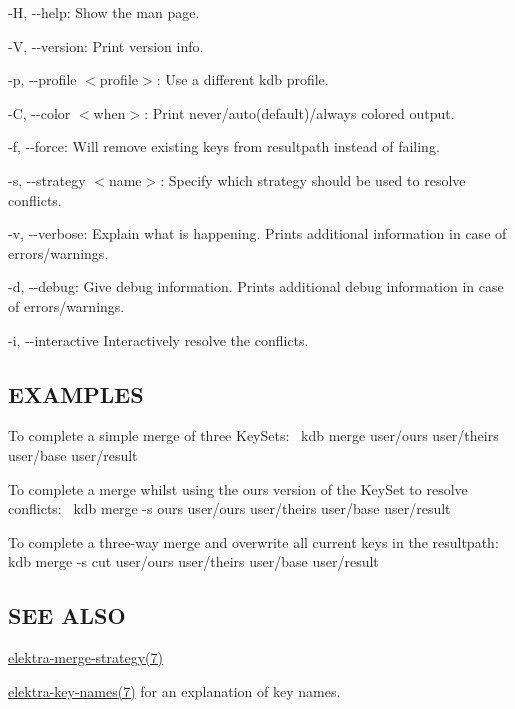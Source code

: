 \begin{DoxyItemize}
\item {\ttfamily -\/H}, {\ttfamily -\/-\/help}\+: Show the man page.
\item {\ttfamily -\/V}, {\ttfamily -\/-\/version}\+: Print version info.
\item {\ttfamily -\/p}, {\ttfamily -\/-\/profile $<$profile$>$}\+: Use a different kdb profile.
\item {\ttfamily -\/C}, {\ttfamily -\/-\/color $<$when$>$}\+: Print never/auto(default)/always colored output.
\item {\ttfamily -\/f}, {\ttfamily -\/-\/force}\+: Will remove existing keys from {\ttfamily resultpath} instead of failing.
\item {\ttfamily -\/s}, {\ttfamily -\/-\/strategy $<$name$>$}\+: Specify which strategy should be used to resolve conflicts.
\item {\ttfamily -\/v}, {\ttfamily -\/-\/verbose}\+: Explain what is happening. Prints additional information in case of errors/warnings.
\item {\ttfamily -\/d}, {\ttfamily -\/-\/debug}\+: Give debug information. Prints additional debug information in case of errors/warnings.
\item {\ttfamily -\/i}, {\ttfamily -\/-\/interactive} Interactively resolve the conflicts.
\end{DoxyItemize}

\subsection*{E\+X\+A\+M\+P\+L\+ES}

To complete a simple merge of three Key\+Sets\+:~\newline
 {\ttfamily kdb merge user/ours user/theirs user/base user/result}~\newline


To complete a merge whilst using the {\ttfamily ours} version of the Key\+Set to resolve conflicts\+:~\newline
 {\ttfamily kdb merge -\/s ours user/ours user/theirs user/base user/result}~\newline


To complete a three-\/way merge and overwrite all current keys in the {\ttfamily resultpath}\+:~\newline
 {\ttfamily kdb merge -\/s cut user/ours user/theirs user/base user/result}~\newline


\subsection*{S\+EE A\+L\+SO}


\begin{DoxyItemize}
\item \hyperlink{doc_help_elektra-merge-strategy_md}{elektra-\/merge-\/strategy(7)}
\item \hyperlink{doc_help_elektra-key-names_md}{elektra-\/key-\/names(7)} for an explanation of key names. 
\end{DoxyItemize}